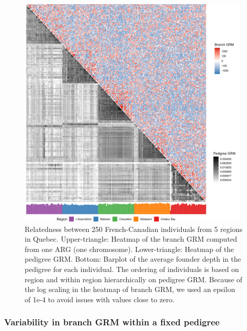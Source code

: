 \begin{figure}
    \centering
    \includegraphics[width=\textwidth]{Figures/Fig4_grm_prm_heatmaps4.jpg}
    \caption{Relatedness between 250 French-Canadian individuals from 5 regions in Quebec.
      Upper-triangle: Heatmap of the branch GRM computed from one ARG (one chromosome).
      Lower-triangle: Heatmap of the pedigree GRM. 
      Bottom: Barplot of the average founder depth in the pedigree for each individual.
      The ordering of individuals is based on region and within region hierarchically on pedigree GRM.
      Because of the log scaling in the heatmap of branch GRM, we used an epsilon of 1e-4 to avoid issues with values close to zero.
    }
    \label{fig:grm_heatmap}
\end{figure}

\subsubsection{Variability in branch GRM within a fixed pedigree}


